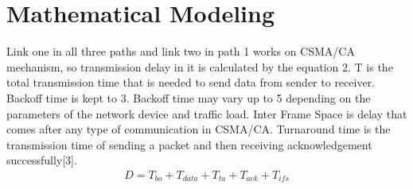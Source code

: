 \documentclass[11pt, conference, compsocconf, onecolumn]{IEEEtran}
\begin{document}
\section{Mathematical Modeling}
Link one in all three paths and link two in path 1 works on CSMA/CA mechanism, so transmission delay in it is calculated by the equation 2. T is the total transmission time that is needed to send data from sender to receiver. Backoff time is kept to 3. Backoff time may vary up to 5 depending on the parameters of the network device and traffic load. Inter Frame Space is delay that comes after any type of communication in CSMA/CA. Turnaround time is the transmission time of sending a packet and then receiving acknowledgement successfully[3].
\begin{eqnarray}
D=T_{bo}+T_{data}+T_{ta}+T_{ack}+T_{ifs}
\end{eqnarray}
\end{document}
